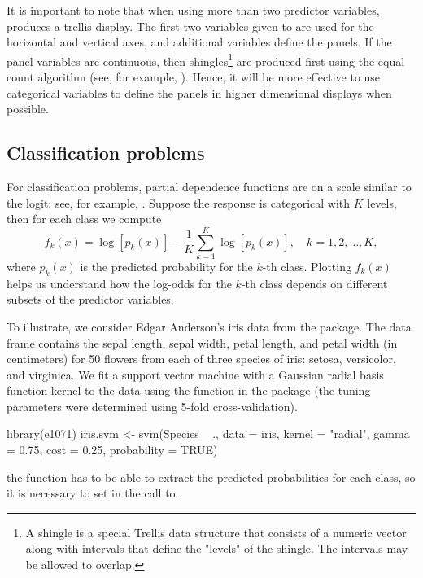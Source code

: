 It is important to note that when using more than two predictor variables,  produces a trellis display. The first two variables given to  are used for the horizontal and vertical axes, and additional variables define the panels. If the panel variables are continuous, then shingles\footnote{A shingle is a special Trellis data structure that consists of a numeric vector along with intervals that define the "levels" of the shingle. The intervals may be allowed to overlap.} are produced first using the equal count algorithm (see, for example, ). Hence, it will be more effective to use categorical variables to define the panels in higher dimensional displays when possible.


\subsection{Classification problems}

For classification problems, partial dependence functions are on a scale similar to the logit; see, for example, \citet[pp. 369---370]{hastie-elements-2009}. Suppose the response is categorical with $K$ levels, then for each class we compute
\begin{equation}
\label{eqn:avg-logit}
f_k(x) = \log\left[p_k(x)\right] - \frac{1}{K}\sum_{k = 1}^K\log\left[p_k(x)\right], \quad k = 1, 2, \dots, K,
\end{equation}
where $p_k(x)$ is the predicted probability for the $k$-th class. Plotting $f_k(x)$ helps us understand how the log-odds for the $k$-th class depends on different subsets of the predictor variables.

To illustrate, we consider Edgar Anderson's iris data from the  package. The  data frame contains the sepal length, sepal width, petal length, and petal width (in centimeters) for 50 flowers from each of three species of iris:  setosa, versicolor, and virginica. We fit a support vector machine with a Gaussian radial basis function kernel to the data using the  function in the  package (the tuning parameters were determined using 5-fold cross-validation).
\begin{example}
library(e1071)
iris.svm <- svm(Species ~ ., data = iris, kernel = "radial", gamma = 0.75,
                cost = 0.25, probability = TRUE)
\end{example}
 the  function has to be able to extract the predicted probabilities for each class, so it is necessary to set  in the call to .

